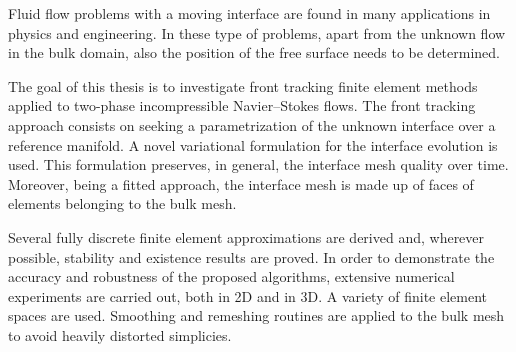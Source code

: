 Fluid flow problems with a moving interface are found in many applications in
physics and engineering. In these type of problems, apart from the unknown flow
in the bulk domain, also the position of the free surface needs to be
determined.

The goal of this thesis is to investigate front tracking finite element methods
applied to two-phase incompressible Navier--Stokes flows. The front tracking
approach consists on seeking a parametrization of the unknown interface over a
reference manifold. A novel variational formulation for the interface evolution
is used. This formulation preserves, in general, the interface mesh quality
over time. Moreover, being a fitted approach, the interface mesh is made up of
faces of elements belonging to the bulk mesh.

Several fully discrete finite element approximations are derived and, wherever
possible, stability and existence results are proved. In order to demonstrate
the accuracy and robustness of the proposed algorithms, extensive numerical
experiments are carried out, both in 2D and in 3D. A variety of finite element
spaces are used. Smoothing and remeshing routines are applied to the bulk mesh
to avoid heavily distorted simplicies.